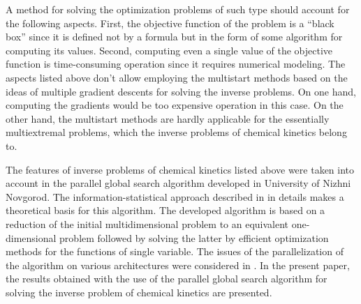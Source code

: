 \documentclass{svproc}
\begin{document}

A method for solving the optimization problems of such type should account for the following aspects. First, the objective function of the problem is a ``black box'' since it is defined not by a formula but in the form of some algorithm for computing its values. Second, computing even a single value of the objective function is time-consuming operation since it requires numerical modeling. The aspects listed above don't allow employing the multistart methods based on the ideas of multiple gradient descents for solving the inverse problems. On one hand, computing the gradients would be too expensive operation in this case. On the other hand, the multistart methods are hardly applicable for the essentially multiextremal problems, which the inverse problems of chemical kinetics belong to.

The features of inverse problems of chemical kinetics listed above were taken into account in the parallel global search algorithm developed in University of Nizhni Novgorod. The information-statistical approach described in \cite{Strongin2000} in details makes a theoretical basis for this algorithm. The developed algorithm is based on a reduction of the initial multidimensional problem to an equivalent one-dimensional problem followed by solving the latter by efficient optimization methods for the functions of single variable. The issues of the parallelization of the algorithm on various architectures were considered in \cite{Barkalov2016,Strongin2018,Barkalov2020}. In the present paper, the results obtained with the use of the parallel global search algorithm for solving the inverse problem of chemical kinetics are presented.
\end{document}
